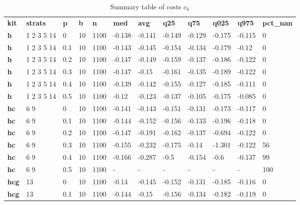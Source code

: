 \begin{longtable}[h]{|p{0.8cm}|p{1.5cm}|p{1cm}|p{1cm}|p{1cm}|p{1cm}|p{1cm}|p{1cm}|p{1cm}|p{1cm}|p{1cm}|p{1.5cm}|}
\caption{Summary table of costs $c_h$}
\label{tab:costs_mod_h} \\
      \hline
\textbf{ kit} & \textbf{ strats} & \textbf{ p} & \textbf{ b} & \textbf{ n} & \textbf{ med} & \textbf{ avg} & \textbf{ q25} & \textbf{ q75} & \textbf{ q025} & \textbf{ q975} & \textbf{ pct\_nan}
           \\
  \textbf{h   } &  1 2 3 5 14 &   0 & 10 & 1100 & -0.138 & -0.141 & -0.149 & -0.129 & -0.175 & -0.115 &   0
           \\
  \textbf{h   } &  1 2 3 5 14 & 0.1 & 10 & 1100 & -0.143 & -0.145 & -0.154 & -0.134 & -0.179 &  -0.12 &   0
           \\
  \textbf{h   } &  1 2 3 5 14 & 0.2 & 10 & 1100 & -0.147 & -0.149 & -0.159 & -0.137 & -0.186 & -0.122 &   0
           \\
  \textbf{h   } &  1 2 3 5 14 & 0.3 & 10 & 1100 & -0.147 &  -0.15 & -0.161 & -0.135 & -0.189 & -0.122 &   0
           \\
  \textbf{h   } &  1 2 3 5 14 & 0.4 & 10 & 1100 & -0.139 & -0.142 & -0.155 & -0.127 & -0.185 & -0.111 &   0
           \\
  \textbf{h   } &  1 2 3 5 14 & 0.5 & 10 & 1100 &  -0.12 & -0.123 & -0.137 & -0.105 & -0.175 & -0.085 &   0
           \\
  \textbf{hc  } &  6 9        &   0 & 10 & 1100 & -0.141 & -0.143 & -0.151 & -0.131 & -0.173 & -0.117 &   0
           \\
  \textbf{hc  } &  6 9        & 0.1 & 10 & 1100 & -0.144 & -0.152 & -0.156 & -0.133 & -0.196 & -0.118 &   0
           \\
  \textbf{hc  } &  6 9        & 0.2 & 10 & 1100 & -0.147 & -0.191 & -0.162 & -0.137 & -0.694 & -0.122 &   0
           \\
  \textbf{hc  } &  6 9        & 0.3 & 10 & 1100 & -0.155 & -0.232 & -0.175 &  -0.14 & -1.301 & -0.122 &  56
           \\
  \textbf{hc  } &  6 9        & 0.4 & 10 & 1100 & -0.166 & -0.287 &   -0.5 & -0.154 &   -0.6 & -0.137 &  99
           \\
  \textbf{hc  } &  6 9        & 0.5 & 10 & 1100 & - & - & - & - & - & - & 100
           \\
  \textbf{hcg } &  13         &   0 & 10 & 1100 &  -0.14 & -0.145 & -0.152 & -0.131 & -0.185 & -0.116 &   0
           \\
  \textbf{hcg } &  13         & 0.1 & 10 & 1100 & -0.144 &  -0.15 & -0.156 & -0.134 & -0.182 & -0.119 &   0

\end{longtable}

